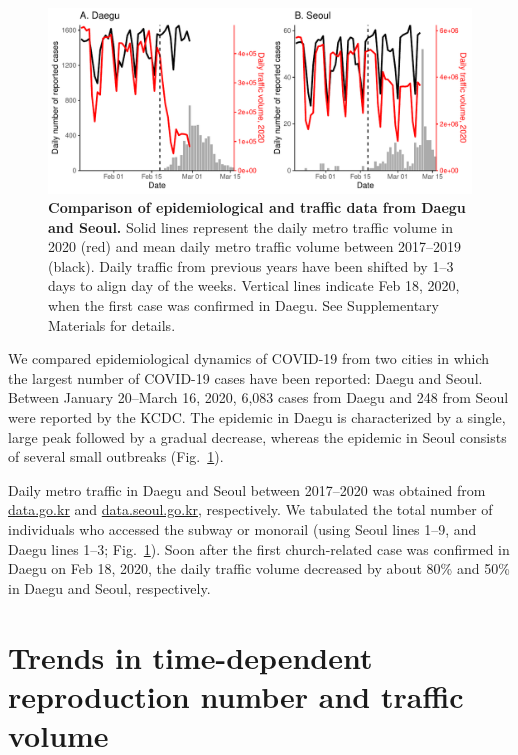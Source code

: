 \documentclass[12pt]{article}
\newcommand{\fref}[1]{Fig.~\ref{fig:#1}}
\begin{document}
\begin{figure}[!h]
\includegraphics[width=\textwidth]{figure_compare_report.pdf}
\caption{
\textbf{Comparison of epidemiological and traffic data from Daegu and Seoul.}
Solid lines represent the daily metro traffic volume in 2020 (red) and mean daily metro traffic volume between 2017--2019 (black).
Daily traffic from previous years have been shifted by 1--3 days to align day of the weeks.
Vertical lines indicate Feb 18, 2020, when the first case was confirmed in Daegu.
See Supplementary Materials for details.
}
\label{fig:data}
\end{figure}

We compared epidemiological dynamics of COVID-19 from two cities in which the largest number of COVID-19 cases have been reported: Daegu and Seoul.
Between January 20--March 16, 2020, 6,083 cases from Daegu and 248 from Seoul were reported by the KCDC.
The epidemic in Daegu is characterized by a single, large peak followed by a gradual decrease, whereas the epidemic in Seoul consists of several small outbreaks (\fref{data}).

Daily metro traffic in Daegu and Seoul between 2017--2020 was obtained from \url{data.go.kr} and \url{data.seoul.go.kr}, respectively.
We tabulated the total number of individuals who accessed the subway or monorail (using Seoul lines 1--9, and Daegu lines 1--3; \fref{data}).
Soon after the first church-related case was confirmed in Daegu on Feb 18, 2020, the daily traffic volume decreased by about 80\% and 50\% in Daegu and Seoul, respectively.


\section{Trends in time-dependent reproduction number and traffic volume}
\end{document}

